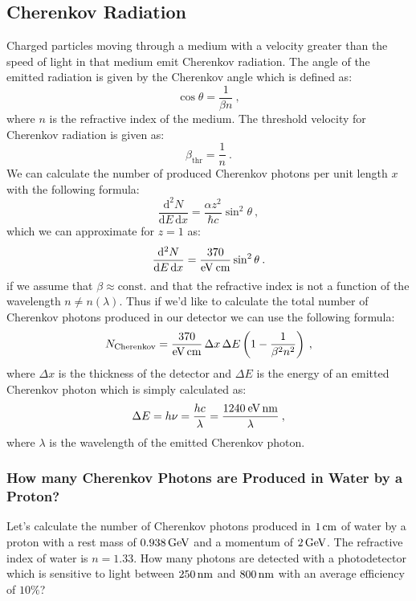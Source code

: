 \documentclass[10pt, titlepage, a4paper]{article}
\newcommand{\dd}{\mathrm{d}}
\numberwithin{equation}{section}
\begin{document}
\subsection{Cherenkov Radiation}
Charged particles moving through a medium with a velocity greater than the speed of light in that medium emit Cherenkov 
radiation. The angle of the emitted radiation is given by the Cherenkov angle which is defined as:
%
\begin{equation}
    \cos{\theta} = \frac{1}{\beta n}\>,
    \label{eq:cherenkov-angle}
\end{equation}
%
where $n$ is the refractive index of the medium. The threshold velocity for Cherenkov radiation is given as:
%
\begin{equation}
    \beta_{\text{thr}} = \frac{1}{n}\>.
    \label{eq:cherenkov-threshold}
\end{equation}
%
We can calculate the number of produced Cherenkov photons per unit length $x$ with the following formula:
%
\begin{equation}
    \frac{\dd^2 N}{\dd E\,\dd x} = \frac{\alpha z^2}{\hbar c}\sin^2{\theta}\>,
\end{equation}
%
which we can approximate for $z=1$ as:
%
\begin{equation}
    \frac{\dd^2 N}{\dd E\,\dd x} = \frac{370}{\rm{eV}\>\rm{cm}}\sin^2{\theta}\>.
    \label{eq:cherenkov-diff}
\end{equation}
%
if we assume that $\beta\approx\text{const.}$ and that the refractive index is not a function of the wavelength $n\neq n(\lambda)$.
Thus if we'd like to calculate the total number of Cherenkov photons produced in our detector we can use the following formula:
%
\begin{equation}
    N_{\rm{Cherenkov}} = \frac{370}{\rm{eV}\,\rm{cm}}\,\Delta x\,\Delta E\left(1 - \frac{1}{\beta^2 n^2}\right)\>,
    \label{eq:cherenkov-total}
\end{equation}
%
where $\Delta x$ is the thickness of the detector and $\Delta E$ is the energy of an emitted Cherenkov photon which is simply
calculated as:
%
\begin{equation}
    \Delta E = h\nu = \frac{hc}{\lambda} = \frac{1240\>\rm{eV}\,\rm{nm}}{\lambda}\>,
    \label{eq:cherenkov-energy}
\end{equation}
%
where $\lambda$ is the wavelength of the emitted Cherenkov photon.

\subsubsection{How many Cherenkov Photons are Produced in Water by a Proton?}
Let's calculate the number of Cherenkov photons produced in $1\,\rm{cm}$ of water by a proton with a rest mass of $0.938\,\rm{GeV}$ and a
momentum of $2\,\rm{GeV}$. The refractive index of water is $n = 1.33$. How many photons are detected with a photodetector which is sensitive to 
light between $250\,\rm{nm}$ and $800\,\rm{nm}$ with an average efficiency of $10\%$? \\
\end{document}
